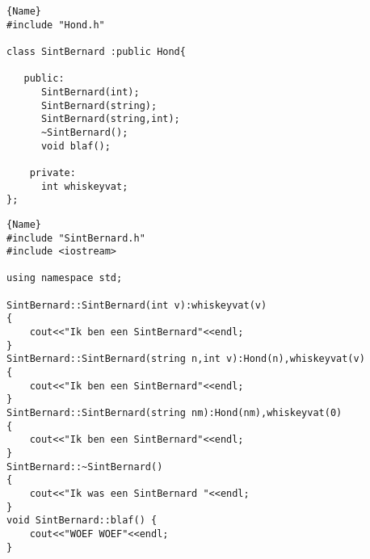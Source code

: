 \noindent\hspace{-1cm}\begin{minipage}{.43\textwidth}
\begin{lstlisting}[caption=SintBernard declaratie file(.h),frame=tlrb,label={lst:vbSintBernardH}]{Name}
#include "Hond.h"

class SintBernard :public Hond{
	
   public:
      SintBernard(int);
      SintBernard(string);
      SintBernard(string,int);
      ~SintBernard();
      void blaf();
	
	private:
	  int whiskeyvat;
};		
\end{lstlisting}
\end{minipage}\hfill
\hspace{0.7cm}\begin{minipage}{.70\textwidth}
	\begin{lstlisting}[caption=SintBernard implementatie file file(.cpp),frame=tlrb,label={lst:vbSintBernardCPP}]{Name}
#include "SintBernard.h"
#include <iostream>

using namespace std;

SintBernard::SintBernard(int v):whiskeyvat(v)
{
	cout<<"Ik ben een SintBernard"<<endl;
}
SintBernard::SintBernard(string n,int v):Hond(n),whiskeyvat(v)
{
	cout<<"Ik ben een SintBernard"<<endl;
}
SintBernard::SintBernard(string nm):Hond(nm),whiskeyvat(0)
{
	cout<<"Ik ben een SintBernard"<<endl;
}
SintBernard::~SintBernard()
{
	cout<<"Ik was een SintBernard "<<endl;
}
void SintBernard::blaf() {
	cout<<"WOEF WOEF"<<endl;
}		
	\end{lstlisting}
\end{minipage}
